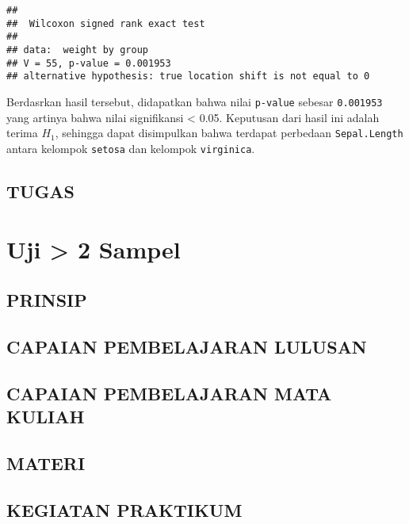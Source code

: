 \documentclass[
]{book}
\begin{document}
\begin{verbatim}
## 
##  Wilcoxon signed rank exact test
## 
## data:  weight by group
## V = 55, p-value = 0.001953
## alternative hypothesis: true location shift is not equal to 0
\end{verbatim}

Berdasrkan hasil tersebut, didapatkan bahwa nilai \texttt{p-value} sebesar \texttt{0.001953} yang artinya bahwa nilai signifikansi \textless{} 0.05. Keputusan dari hasil ini adalah terima \(H_1\), sehingga dapat disimpulkan bahwa terdapat perbedaan \texttt{Sepal.Length} antara kelompok \texttt{setosa} dan kelompok \texttt{virginica}.

\hypertarget{tugas-1}{%
\section{TUGAS}\label{tugas-1}}

\hypertarget{a4-uji-lebih-2-sampel}{%
\chapter{Uji \textgreater{} 2 Sampel}\label{a4-uji-lebih-2-sampel}}

\hypertarget{prinsip-2}{%
\section{PRINSIP}\label{prinsip-2}}

\hypertarget{capaian-pembelajaran-lulusan-2}{%
\section{CAPAIAN PEMBELAJARAN LULUSAN}\label{capaian-pembelajaran-lulusan-2}}

\hypertarget{capaian-pembelajaran-mata-kuliah-2}{%
\section{CAPAIAN PEMBELAJARAN MATA KULIAH}\label{capaian-pembelajaran-mata-kuliah-2}}

\hypertarget{materi-1}{%
\section{MATERI}\label{materi-1}}

\hypertarget{kegiatan-praktikum-2}{%
\section{KEGIATAN PRAKTIKUM}\label{kegiatan-praktikum-2}}
\end{document}
